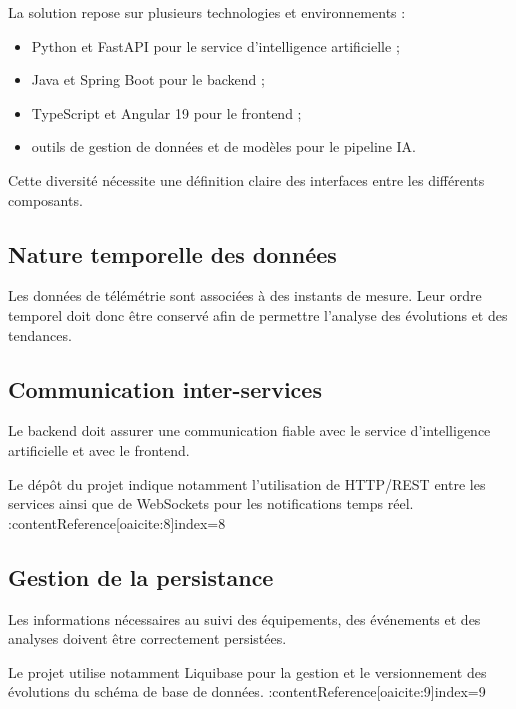La solution repose sur plusieurs technologies et environnements :

\begin{itemize}

    \item Python et FastAPI pour le service d'intelligence artificielle ;

    \item Java et Spring Boot pour le backend ;

    \item TypeScript et Angular 19 pour le frontend ;

    \item outils de gestion de données et de modèles pour le pipeline IA.

\end{itemize}

Cette diversité nécessite une définition claire des interfaces entre les
différents composants.

\subsection{Nature temporelle des données}

Les données de télémétrie sont associées à des instants de mesure. Leur
ordre temporel doit donc être conservé afin de permettre l'analyse des
évolutions et des tendances.

\subsection{Communication inter-services}

Le backend doit assurer une communication fiable avec le service
d'intelligence artificielle et avec le frontend.

Le dépôt du projet indique notamment l'utilisation de HTTP/REST entre les
services ainsi que de WebSockets pour les notifications temps réel. :contentReference[oaicite:8]{index=8}

\subsection{Gestion de la persistance}

Les informations nécessaires au suivi des équipements, des événements et
des analyses doivent être correctement persistées.

Le projet utilise notamment Liquibase pour la gestion et le versionnement
des évolutions du schéma de base de données. :contentReference[oaicite:9]{index=9}

